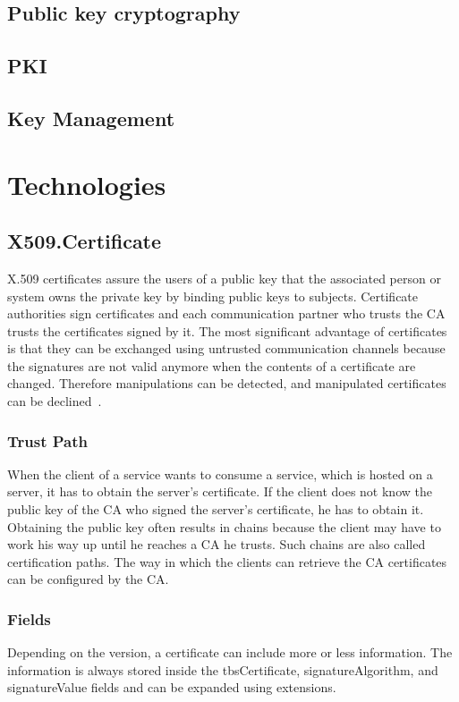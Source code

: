 \subsection{Public key cryptography}

\subsection{PKI}

\subsection{Key Management}


\section{Technologies}
\subsection{X509.Certificate}
X.509 certificates assure the users of a public key that the associated person or system owns the private key by binding public keys to subjects.
Certificate authorities sign certificates and each communication partner who trusts the CA trusts the certificates signed by it.
The most significant advantage of certificates is that they can be exchanged using untrusted communication channels because the signatures are not valid anymore when the contents of a certificate are changed.
Therefore manipulations can be detected, and manipulated certificates can be declined~\cite{x509rfc}.

\subsubsection{Trust Path}
When the client of a service wants to consume a service, which is hosted on a server, it has to obtain the server's certificate.
If the client does not know the public key of the CA who signed the server's certificate, he has to obtain it.
Obtaining the public key often results in chains because the client may have to work his way up until he reaches a CA he trusts.
Such chains are also called certification paths.
The way in which the clients can retrieve the CA certificates can be configured by the CA.

\subsubsection{Fields}
Depending on the version, a certificate can include more or less information.
The information is always stored inside the tbsCertificate, signatureAlgorithm, and signatureValue fields and can be expanded using extensions.

